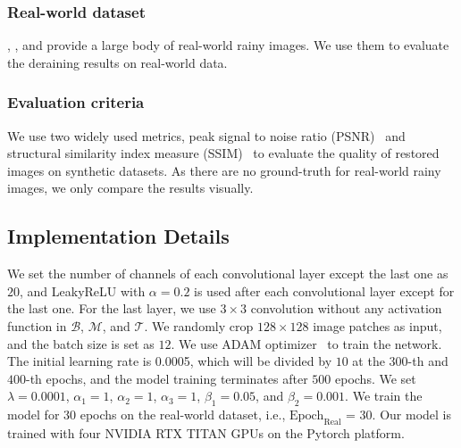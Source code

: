 \documentclass[letterpaper]{article} %
\def\etal{{\emph{et al}}}
\begin{document}
\subsubsection{Real-world dataset}
%
%
\citet{derain_jorder_yang}, \citet{deraining-benchmark-analysis}, and \citet{mm20_wang_jdnet} provide a large body of real-world rainy images. We use them to evaluate the deraining results on real-world data.
\subsubsection{Evaluation criteria}
%
We use two widely used metrics, peak signal to noise ratio (PSNR)~\cite{PSNR_thu} and structural similarity index measure (SSIM)~\cite{SSIM_wang} to evaluate the quality of restored images on synthetic datasets.
As there are no ground-truth for real-world rainy images, we only compare the results visually.
%
\subsection{Implementation Details}
%
We set the number of channels of each convolutional layer except the last one as $20$, and LeakyReLU with $\alpha = 0.2$ is used after each convolutional layer except for the last one.
For the last layer, we use $3 \times 3$ convolution without any activation function in $\mathcal{B}$, $\mathcal{M}$, and $\mathcal{T}$.
We randomly crop $128\times128$ image patches as input, and the batch size is set as $12$.
We use ADAM optimizer~\cite{adam} to train the network.
%
The initial learning rate is 0.0005, which will be divided by $10$ at the $300$-th and $400$-th epochs, and the model training terminates after $500$ epochs.
We set $\lambda=0.0001$, $\alpha_{1}=1$, $\alpha_{2}=1$,  $\alpha_{3}=1$,  $\beta_{1}=0.05$, and $\beta_{2}=0.001$.
%
We train the model for 30 epochs on the real-world dataset, i.e., $\mathrm{Epoch}_{\mathrm{Real}}$ = 30.
Our model is trained with four NVIDIA RTX TITAN GPUs on the Pytorch platform.
%
\end{document}
